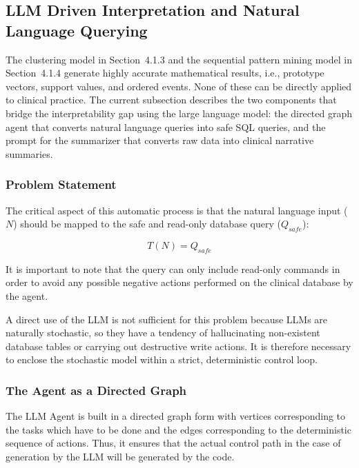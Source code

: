 \subsection{LLM Driven Interpretation and Natural Language Querying}

The clustering model in Section~4.1.3 and the sequential pattern mining model in Section~4.1.4 generate highly accurate mathematical results, i.e., prototype vectors, support values, and ordered events. None of these can be directly applied to clinical practice. The current subsection describes the two components that bridge the interpretability gap using the large language model: the directed graph agent that converts natural language queries into safe SQL queries, and the prompt for the summarizer that converts raw data into clinical narrative summaries.

\subsubsection*{Problem Statement}

The critical aspect of this automatic process is that the natural language input ($N$) should be mapped to the safe and read-only database query ($Q_{safe}$):

\begin{equation}
    T(N) = Q_{safe}
    \label{eq:translation}
\end{equation}

It is important to note that the query can only include read-only commands in order to avoid any possible negative actions performed on the clinical database by the agent.

A direct use of the LLM is not sufficient for this problem because LLMs are naturally stochastic, so they have a tendency of hallucinating non-existent database tables or carrying out destructive write actions. It is therefore necessary to enclose the stochastic model within a strict, deterministic control loop.

\subsubsection*{The Agent as a Directed Graph}

The LLM Agent is built in a directed graph form with vertices corresponding to the tasks which have to be done and the edges corresponding to the deterministic sequence of actions. Thus, it ensures that the actual control path in the case of generation by the LLM will be generated by the code.

